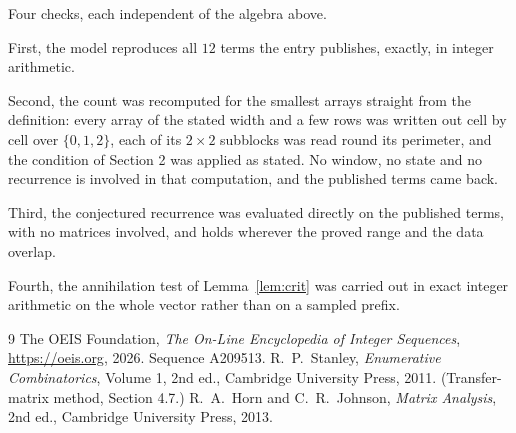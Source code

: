 \documentclass[11pt,a4paper]{article}
\theoremstyle{plain}
\theoremstyle{definition}
\begin{document}
Four checks, each independent of the algebra above.

First, the model reproduces all $12$ terms the entry publishes, exactly, in integer
arithmetic.

Second, the count was recomputed for the smallest arrays straight from the definition: every
array of the stated width and a few rows was written out cell by cell over $\{0,1,2\}$, each of
its $2\times2$ subblocks was read round its perimeter, and the condition of Section 2 was
applied as stated. No window, no state and no recurrence is involved in that computation, and
the published terms came back.

Third, the conjectured recurrence was evaluated directly on the published terms, with no
matrices involved, and holds wherever the proved range and the data overlap.

Fourth, the annihilation test of Lemma~\ref{lem:crit} was carried out in exact integer
arithmetic on the whole vector rather than on a sampled prefix.

\begin{thebibliography}{9}
 The OEIS Foundation, \emph{The On-Line Encyclopedia of Integer
Sequences}, \url{https://oeis.org}, 2026. Sequence A209513.
 R.~P.~Stanley, \emph{Enumerative Combinatorics}, Volume 1, 2nd ed.,
Cambridge University Press, 2011. (Transfer-matrix method, Section 4.7.)
 R.~A.~Horn and C.~R.~Johnson, \emph{Matrix Analysis}, 2nd ed., Cambridge
University Press, 2013.
\end{thebibliography}
\end{document}
